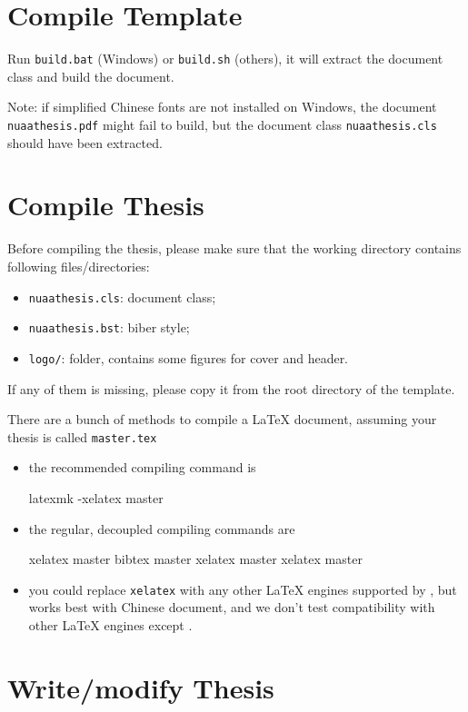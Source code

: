 \section{Compile Template}

Run \verb|build.bat| (Windows) or \verb|build.sh| (others),
it will extract the document class and build the document.

Note:
if simplified Chinese fonts are not installed on Windows,
the document \texttt{nuaathesis.pdf} might fail to build,
but the document class \texttt{nuaathesis.cls} should have been extracted.

\section{Compile Thesis}

Before compiling the thesis,
please make sure that the working directory contains following files/directories:
\begin{itemize}
  \item \verb|nuaathesis.cls|: document class;
  \item \verb|nuaathesis.bst|: biber style;
  \item \verb|logo/|: folder, contains some figures for cover and header.
\end{itemize}
If any of them is missing, please copy it from the root directory of the template.

There are a bunch of methods to compile a \LaTeX{} document,
assuming your thesis is called \verb|master.tex|
\begin{itemize}
\item the recommended compiling command is
\begin{shell}
latexmk -xelatex master
\end{shell}
\item the regular, decoupled compiling commands are
\begin{shell}
xelatex master
bibtex master
xelatex master
xelatex master
\end{shell}
\item you could replace \verb|xelatex| with any other \LaTeX{} engines supported by \CTeX,
but \XeLaTeX{} works best with Chinese document,
and we don't test compatibility with other \LaTeX{} engines except \XeLaTeX.
\end{itemize}

\section{Write/modify Thesis}

